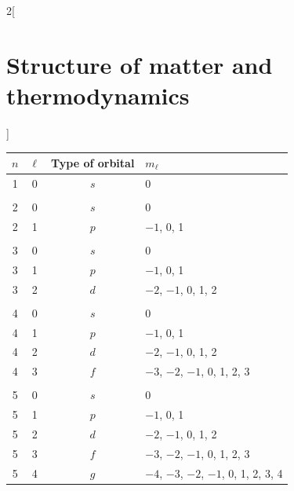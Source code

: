 \documentclass[../../../main.tex]{subfiles}
\begin{document}
\begin{multicols}{2}[\section{Structure of matter and thermodynamics}]
\begin{definition}[Spin]
  \end{definition}
  \begin{center}
    \begin{minipage}{\linewidth}
      \centering
      \begin{tabular}{cccl}
        \hline
        \hline
        $n$ & $\ell$ & Type of orbital & $m_\ell$                              \\
        \hline
        1   & 0      & $s$             & 0                                     \\
            &        &                 &                                       \\
        2   & 0      & $s$             & 0                                     \\
        2   & 1      & $p$             & $-1$, 0, 1                            \\
            &        &                 &                                       \\
        3   & 0      & $s$             & 0                                     \\
        3   & 1      & $p$             & $-1$, 0, 1                            \\
        3   & 2      & $d$             & $-2$, $-1$, 0, 1, 2                   \\
            &        &                 &                                       \\
        4   & 0      & $s$             & 0                                     \\
        4   & 1      & $p$             & $-1$, 0, 1                            \\
        4   & 2      & $d$             & $-2$, $-1$, 0, 1, 2                   \\
        4   & 3      & $f$             & $-3$, $-2$, $-1$, 0, 1, 2, 3          \\
            &        &                 &                                       \\
        5   & 0      & $s$             & 0                                     \\
        5   & 1      & $p$             & $-1$, 0, 1                            \\
        5   & 2      & $d$             & $-2$, $-1$, 0, 1, 2                   \\
        5   & 3      & $f$             & $-3$, $-2$, $-1$, 0, 1, 2, 3          \\
        5   & 4      & $g$             & $-4$, $-3$, $-2$, $-1$, 0, 1, 2, 3, 4 \\
        \hline
        \hline
      \end{tabular}
    \end{minipage}
  \end{center}

\end{multicols}
\end{document}

